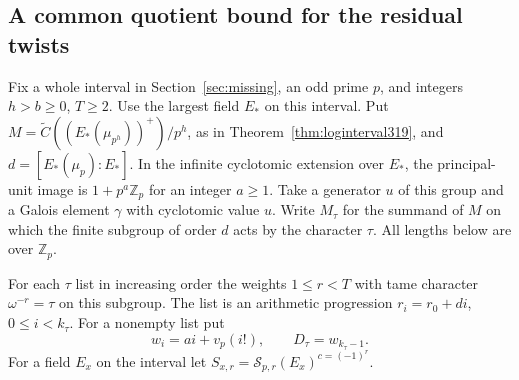 \documentclass[a4paper,11pt]{article}
\theoremstyle{definition}
\theoremstyle{remark}
\newcommand{\ZZ}{\mathbb Z}\newcommand{\ord}{\operatorname{ord}}
\numberwithin{equation}{section}
\begin{document}
\subsection{A common quotient bound for the residual twists}\label{nav:II-78}
Fix a whole interval in Section~\ref{sec:missing}, an odd
prime \(p\), and integers \(h>b\ge0\), \(T\ge2\). Use the
largest field \(E_*\) on this interval. Put
\(M=\widetilde C((E_*(\mu_{p^h}))^+)/p^h\), as in
Theorem~\ref{thm:loginterval319}, and
\(d=[E_*(\mu_p):E_*]\).
In the infinite cyclotomic extension over \(E_*\), the
principal-unit image is \(1+p^a\ZZ_p\) for an integer
\(a\ge1\). Take a generator \(u\) of this group and a
Galois element \(\gamma\) with cyclotomic value \(u\).
Write \(M_\tau\) for the summand of \(M\) on which the
finite subgroup of order \(d\) acts by the character \(\tau\).
All lengths below are over \(\ZZ_p\).

For each \(\tau\) list in increasing order the weights
\(1\le r<T\) with tame character \(\omega^{-r}=\tau\)
on this subgroup. The list is an arithmetic progression
\(r_i=r_0+di\), \(0\le i<k_\tau\). For a nonempty list put
\[
     w_i=ai+v_p(i!),\qquad D_\tau=w_{k_\tau-1}.
\]
For a field \(E_x\) on the interval let
\(S_{x,r}=\mathcal S_{p,r}(E_x)^{c=(-1)^r}\).
\end{document}
